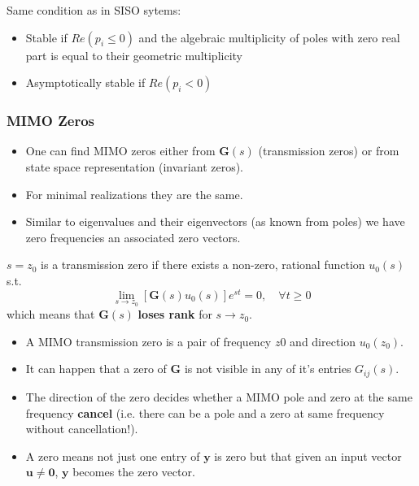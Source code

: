 
Same condition as in SISO sytems:
\begin{itemize}
    \item Stable if $Re(p_i \le 0)$ and the algebraic multiplicity of poles with zero real part is equal to their geometric multiplicity
    \item Asymptotically stable if $Re(p_i<0)$
\end{itemize}


\subsubsection{MIMO Zeros}
\begin{itemize}
    \item One can find MIMO zeros either from $\mathbf{G}(s)$ (transmission zeros) or from state space representation (invariant zeros).
    \item For minimal realizations they are the same.
    \item Similar to eigenvalues and their eigenvectors (as known from poles) we have zero frequencies an associated zero vectors.
\end{itemize}


$s = z_0$ is a transmission zero if there exists a non-zero, rational function $u_0(s)$ s.t.
\begin{equation*}
    \lim_{s\to z_0}\left[\mathbf{G}(s)u_0(s)\right]e^{st}=0,\quad\forall t\geq0
\end{equation*}
which means that $\mathbf{\mathbf{G}}(s)$ \textbf{loses rank} for $s\rightarrow z_0$.


\begin{itemize}
    \item A MIMO transmission zero is a pair of frequency $z0$ and direction $u_0(z_0)$.
    \item It can happen that a zero of $\mathbf{G}$ is not visible in any of it's entries $G_{ij}(s)$.
    \item The direction of the zero decides whether a MIMO pole and zero at the same frequency \textbf{cancel} (i.e. there can be a pole and a zero at same frequency without cancellation!).
    \item A zero means not just one entry of $\mathbf{y}$ is zero but that given an input vector $\mathbf{u} \ne \mathbf{0}$, $\mathbf{y}$ becomes the zero vector.
\end{itemize}

